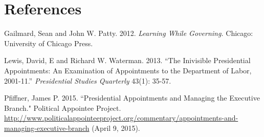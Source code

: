 \documentclass[12pt]{article}
\begin{document}
\section{References}
\noindent \hangindent=0.7cm Gailmard, Sean and John W. Patty. 2012. \textit{Learning While Governing.} Chicago: University of Chicago Press. 

\noindent \hangindent=0.7cm Lewis, David, E and Richard W. Waterman. 2013. ``The Inivisible Presidential Appointments: An Examination of Appointments to the Department of Labor, 2001-11.'' \textit{Presidential Studies Quarterly} 43(1): 35-57.

\noindent \hangindent=0.7cm Pfiffner, James P. 2015. ``Presidential Appointments and Managing the Executive Branch." Political Appointee Project. \url{http://www.politicalappointeeproject.org/commentary/appointments-and-managing-executive-branch} (April 9, 2015).
\end{document}
